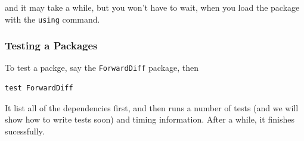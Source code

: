 and it may take a while, but you won't have to wait, when you load the
package with the \texttt{using} command.

\hypertarget{testing-a-packages}{%
\subsubsection{Testing a Packages}\label{testing-a-packages}}

To test a packge, say the \texttt{ForwardDiff} package, then

\begin{verbatim}
test ForwardDiff
\end{verbatim}

It list all of the dependencies first, and then runs a number of tests
(and we will show how to write tests soon) and timing information. After
a while, it finishes sucessfully.
